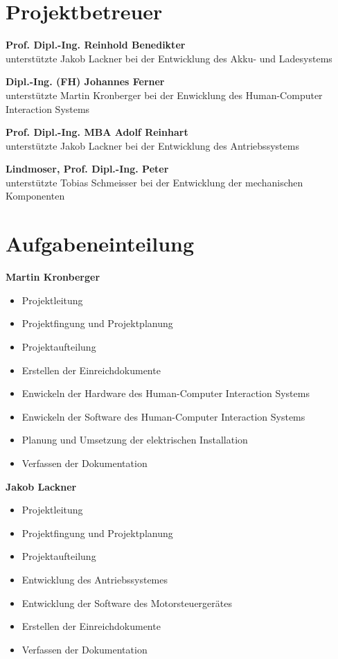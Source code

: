 \section{Projektbetreuer}

\textbf{Prof. Dipl.-Ing. Reinhold Benedikter}\\
unterstützte Jakob Lackner bei der Entwicklung des Akku- und Ladesystems
\bigskip

\textbf{Dipl.-Ing. (FH) Johannes Ferner}\\
unterstützte Martin Kronberger bei der Enwicklung des Human-Computer Interaction Systems
\bigskip

\textbf{Prof. Dipl.-Ing. MBA Adolf Reinhart}\\
unterstützte Jakob Lackner bei der Entwicklung des Antriebssystems
\bigskip

\textbf{Lindmoser, Prof. Dipl.-Ing. Peter}\\
unterstützte Tobias Schmeisser bei der Entwicklung der mechanischen Komponenten

\section{Aufgabeneinteilung}

\textbf{Martin Kronberger}
\begin{itemize}
	\item Projektleitung
	\item Projektfingung und Projektplanung
	\item Projektaufteilung
	\item Erstellen der Einreichdokumente
	\item Enwickeln der Hardware des Human-Computer Interaction Systems
	\item Enwickeln der Software des Human-Computer Interaction Systems
	\item Planung und Umsetzung der elektrischen Installation	
	\item Verfassen der Dokumentation
\end{itemize}
\bigskip

\textbf{Jakob Lackner}
\begin{itemize}
	\item Projektleitung
	\item Projektfingung und Projektplanung
	\item Projektaufteilung
	\item Entwicklung des Antriebssystemes
	\item Entwicklung der Software des Motorsteuergerätes
	\item Erstellen der Einreichdokumente
	\item Verfassen der Dokumentation
\end{itemize}

